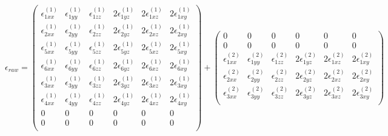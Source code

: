 \begin{equation*}
\epsilon_{raw} =  \begin{pmatrix}
\epsilon_{1xx}^{\left(1\right)}&\epsilon_{1yy}^{\left(1\right)}&\epsilon_{1zz}^{\left(1\right)}&2\epsilon_{1yz}^{\left(1\right)}&2\epsilon_{1xz}^{\left(1\right)}&2\epsilon_{1xy}^{\left(1\right)} \\
\epsilon_{2xx}^{\left(1\right)}&\epsilon_{2yy}^{\left(1\right)}&\epsilon_{2zz}^{\left(1\right)}&2\epsilon_{2yz}^{\left(1\right)}&2\epsilon_{2xz}^{\left(1\right)}&2\epsilon_{2xy}^{\left(1\right)} \\
\epsilon_{5xx}^{\left(1\right)}&\epsilon_{5yy}^{\left(1\right)}&\epsilon_{5zz}^{\left(1\right)}&2\epsilon_{5yz}^{\left(1\right)}&2\epsilon_{5xz}^{\left(1\right)}&2\epsilon_{5xy}^{\left(1\right)} \\
\epsilon_{6xx}^{\left(1\right)}&\epsilon_{6yy}^{\left(1\right)}&\epsilon_{6zz}^{\left(1\right)}&2\epsilon_{6yz}^{\left(1\right)}&2\epsilon_{6xz}^{\left(1\right)}&2\epsilon_{6xy}^{\left(1\right)} \\
\epsilon_{3xx}^{\left(1\right)}&\epsilon_{3yy}^{\left(1\right)}&\epsilon_{3zz}^{\left(1\right)}&2\epsilon_{3yz}^{\left(1\right)}&2\epsilon_{3xz}^{\left(1\right)}&2\epsilon_{3xy}^{\left(1\right)} \\
\epsilon_{4xx}^{\left(1\right)}&\epsilon_{4yy}^{\left(1\right)}&\epsilon_{4zz}^{\left(1\right)}&2\epsilon_{4yz}^{\left(1\right)}&2\epsilon_{4xz}^{\left(1\right)}&2\epsilon_{4xy}^{\left(1\right)} \\
0 & 0 & 0 & 0 & 0 & 0 \\ 
0 & 0 & 0 & 0 & 0 & 0 \\ 
\end{pmatrix} +  \begin{pmatrix}
0 & 0 & 0 & 0 & 0 & 0 \\ 
0 & 0 & 0 & 0 & 0 & 0 \\ 
\epsilon_{1xx}^{\left(2\right)}&\epsilon_{1yy}^{\left(2\right)}&\epsilon_{1zz}^{\left(2\right)}&2\epsilon_{1yz}^{\left(2\right)}&2\epsilon_{1xz}^{\left(2\right)}&2\epsilon_{1xy}^{\left(2\right)} \\
\epsilon_{2xx}^{\left(2\right)}&\epsilon_{2yy}^{\left(2\right)}&\epsilon_{2zz}^{\left(2\right)}&2\epsilon_{2yz}^{\left(2\right)}&2\epsilon_{2xz}^{\left(2\right)}&2\epsilon_{2xy}^{\left(2\right)} \\
\epsilon_{3xx}^{\left(2\right)}&\epsilon_{3yy}^{\left(2\right)}&\epsilon_{3zz}^{\left(2\right)}&2\epsilon_{3yz}^{\left(2\right)}&2\epsilon_{3xz}^{\left(2\right)}&2\epsilon_{3xy}^{\left(2\right)} \\

\end{pmatrix}
\end{equation*}
